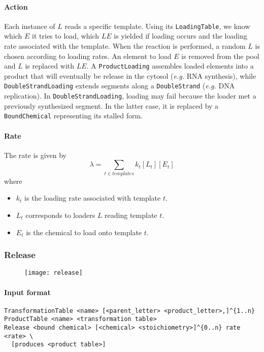 \paragraph{Action} Each instance of $L$ reads a specific template. Using its \texttt{LoadingTable}, we know which $E$ it tries to load, which $LE$ is yielded if loading occurs and the loading rate associated with the template. When the reaction is performed, a random $L$ is chosen according to loading rates. An element to load $E$ is removed from the pool and $L$ is replaced with $LE$. A \texttt{ProductLoading} assembles loaded elements into a product that will eventually be release in the cytosol (\textit{e.g.} RNA synthesis), while \texttt{DoubleStrandLoading} extends segments along a \texttt{DoubleStrand} (\textit{e.g.} DNA replication). In \texttt{DoubleStrandLoading}, loading may fail because the loader met a previously synthesized segment. In the latter case, it is replaced by a \texttt{BoundChemical} representing its stalled form.

\paragraph{Rate} The rate is given by
$$
	\lambda = \sum_{t\in templates} k_t[L_t][E_t]
$$
where
\begin{itemize}
	\item $k_t$ is the loading rate associated with template $t$.
	\item $L_t$ corresponds to loaders $L$ reading template $t$.
	\item $E_t$ is the chemical to load onto template $t$.
\end{itemize}

\subsubsection{Release}

\begin{figure}[!ht]
	\centering
	\texttt{[image: release]}
\end{figure}

\paragraph{Input format}
\begin{verbatim}
TransformationTable <name> [<parent_letter> <product_letter>,]^{1..n}
ProductTable <name> <transformation table>
Release <bound chemical> [<chemical> <stoichiometry>]^{0..n} rate <rate> \
  [produces <product table>]
\end{verbatim}

